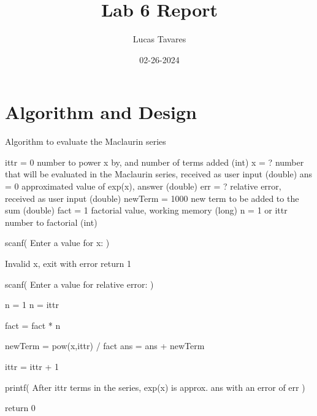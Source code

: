 \documentclass{article}
\title{Lab 6 Report}
\date{02-26-2024}
\author{Lucas Tavares}
\begin{document}
\maketitle


\newpage

\section{Algorithm and Design}

\begin{algorithm}

  \caption{Algorithm to evaluate the Maclaurin series}

    \begin{algorithmic}

      \Statex {}
      \State ittr = 0  number to power x by, and number of terms added (int)
      \State x = ?  number that will be evaluated in the Maclaurin series, received as user input (double)
      \State ans = 0  approximated value of exp(x), answer (double)
      \State err = ?  relative error, received as user input (double)
      \State newTerm = 1000  new term to be added to the sum (double)
      \State fact = 1  factorial value, working memory (long)
      \State n = 1 or ittr  number to factorial (int)

      \Statex {}

      \State scanf( Enter a value for x:  )
      
        \State Invalid x, exit with error
        \State return 1
      \EndIf

      \State scanf( Enter a value for relative error:  )

      \Statex {}

      \Statex {}


          \State n = 1
        \Else
          \State n = ittr
        \EndIf

        \State fact = fact * n

        \State newTerm = pow(x,ittr) / fact
        \State ans = ans + newTerm

        \State ittr = ittr + 1

      \EndWhile

      \State printf( After ittr terms in the series, exp(x) is approx. ans with an error of err )

      \State return 0

    \end{algorithmic}

\end{algorithm}
\end{document}
